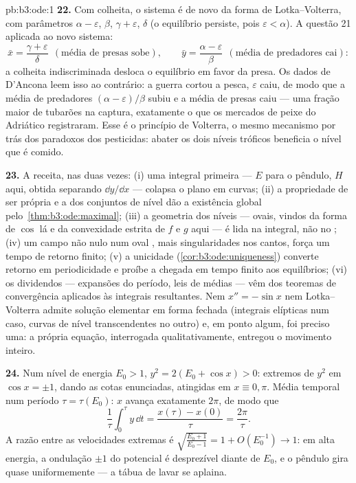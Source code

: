 \begin{solution}{pb:b3:ode:1}
\textbf{22.} Com colheita, o sistema é de novo da forma de
Lotka--Volterra, com parâmetros $\alpha -
\varepsilon$, $\beta$, $\gamma + \varepsilon$, $\delta$ (o
equilíbrio  persiste, pois $\varepsilon <
\alpha$). A questão 21 aplicada ao novo sistema:
\[
\bar x = \frac{\gamma + \varepsilon}{\delta}
\ \ (\text{média de presas sobe}),
\qquad
\bar y = \frac{\alpha - \varepsilon}{\beta}
\ \ (\text{média de predadores cai}) :
\]
a colheita indiscriminada desloca o equilíbrio em favor da
presa. Os dados de D'Ancona leem isso ao contrário: a guerra cortou
a pesca, $\varepsilon$ caiu, de modo que a média de predadores
$(\alpha - \varepsilon)/\beta$ subiu e a média de presas
caiu --- uma fração maior de tubarões na captura, exatamente o que
os mercados de peixe do Adriático registraram. Esse é o princípio de
Volterra, o mesmo mecanismo por trás dos paradoxos dos pesticidas:
abater os dois níveis tróficos beneficia o nível que é comido.

\textbf{23.} A receita, nas duas vezes: (i) uma integral primeira
--- $E$ para o pêndulo, $H$ aqui, obtida separando
$\dd y/\dd x$ --- colapsa o plano em curvas; (ii) a
propriedade de ser própria e a  dos conjuntos de nível dão a existência
global pelo~\cref{thm:b3:ode:maximal}; (iii) a
geometria dos níveis --- ovais, vindos da forma de $\cos$
lá e da convexidade estrita de $f$ e $g$ aqui --- é
lida na integral, não no ; (iv) um campo não nulo
num oval , mais singularidades  nos cantos,
força um tempo de retorno finito; (v) a unicidade
(\cref{cor:b3:ode:uniqueness}) converte retorno em
periodicidade e proíbe a chegada em tempo finito aos equilíbrios;
(vi) os dividendos --- expansões do período, leis de médias
--- vêm dos teoremas de convergência aplicados às
integrais resultantes. Nem $x'' = -\sin x$ nem
Lotka--Volterra admite solução elementar em forma fechada
(integrais elípticas num caso, curvas de nível transcendentes
no outro) e, em ponto algum, foi preciso uma: a própria
equação, interrogada qualitativamente, entregou o movimento
inteiro.

\textbf{24.} Num nível de energia $E_0 > 1$, $y^2 = 2(E_0 +
\cos x) > 0$: extremos de $y^2$ em $\cos x = \pm1$, dando
as cotas enunciadas, atingidas em $x \equiv 0, \pi$. Média
temporal num período $\tau = \tau(E_0)$: $x$ avança
exatamente $2\pi$, de modo que
\[
\frac1\tau\int_0^\tau y\,\dd t = \frac{x(\tau) -
x(0)}{\tau} = \frac{2\pi}\tau .
\]
A razão entre as velocidades extremas é $\sqrt{\frac{E_0 + 1}{E_0 -
1}} = 1 + O(E_0^{-1}) \to 1$: em alta energia, a ondulação
$\pm1$ do potencial é desprezível diante de $E_0$, e o pêndulo
gira quase uniformemente --- a tábua de lavar se aplaina.


\end{solution}
